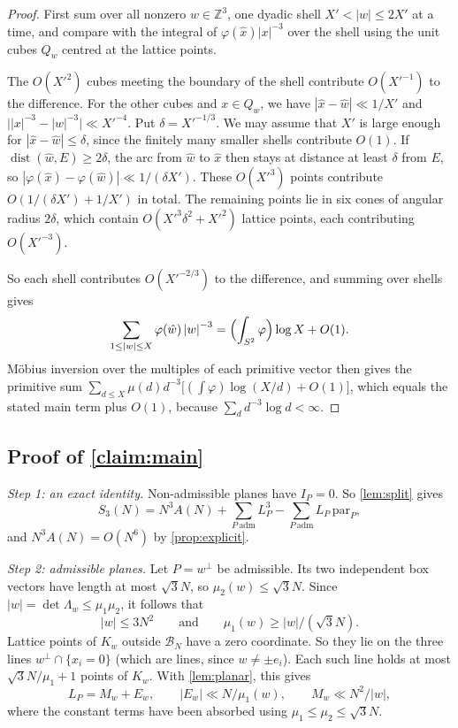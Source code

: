 \documentclass[11pt]{article}
\theoremstyle{definition}
\newcommand{\Z}{\mathbb{Z}}
\newcommand{\BN}{\mathcal{B}_N}
\newcommand{\abs}[1]{\left\lvert #1 \right\rvert}
\begin{document}
\begin{proof}
First sum over all nonzero $w\in\Z^3$, one dyadic shell $X'<\abs w\le2X'$ at a time, and compare with the integral of $\varphi(\hat x)\abs x^{-3}$ over the shell using the unit cubes $Q_w$ centred at the lattice points.

The $O(X'^2)$ cubes meeting the boundary of the shell contribute $O(X'^{-1})$ to the difference. For the other cubes and $x\in Q_w$, we have $\abs{\hat x-\hat w}\ll1/X'$ and $\bigl|\abs x^{-3}-\abs w^{-3}\bigr|\ll X'^{-4}$. Put $\delta=X'^{-1/3}$. We may assume that $X'$ is large enough for $\abs{\hat x-\hat w}\le\delta$, since the finitely many smaller shells contribute $O(1)$. If $\operatorname{dist}(\hat w,E)\ge2\delta$, the arc from $\hat w$ to $\hat x$ then stays at distance at least $\delta$ from $E$, so $\abs{\varphi(\hat x)-\varphi(\hat w)}\ll1/(\delta X')$. These $O(X'^3)$ points contribute $O(1/(\delta X')+1/X')$ in total. The remaining points lie in six cones of angular radius $2\delta$, which contain $O(X'^3\delta^2+X'^2)$ lattice points, each contributing $O(X'^{-3})$.

So each shell contributes $O(X'^{-2/3})$ to the difference, and summing over shells gives
\[
\sum_{1\le\abs w\le X}\varphi(\hat w)\abs w^{-3}=\Bigl(\int_{S^2}\varphi\Bigr)\log X+O(1).
\]
Möbius inversion over the multiples of each primitive vector then gives the primitive sum $\sum_{d\le X}\mu(d)d^{-3}\bigl[(\int\varphi)\log(X/d)+O(1)\bigr]$, which equals the stated main term plus $O(1)$, because $\sum_dd^{-3}\log d<\infty$.
\end{proof}

\subsection{Proof of \texorpdfstring{\cref{claim:main}}{the main theorem}}

\emph{Step 1: an exact identity.} Non-admissible planes have $I_P=0$. So \cref{lem:split} gives
\begin{equation}\label{eq:identity}
S_3(N)=N^3A(N)+\sum_{P\ \text{adm}}L_P^3-\sum_{P\ \text{adm}}L_P\,\mathrm{par}_P,
\end{equation}
and $N^3A(N)=O(N^6)$ by \cref{prop:explicit}.

\emph{Step 2: admissible planes.} Let $P=w^\perp$ be admissible. Its two independent box vectors have length at most $\sqrt3N$, so $\mu_2(w)\le\sqrt3N$. Since $\abs w=\det\Lambda_w\le\mu_1\mu_2$, it follows that
\[
\abs w\le3N^2\qquad\text{and}\qquad\mu_1(w)\ge\abs w/(\sqrt3N).
\]
Lattice points of $K_w$ outside $\BN$ have a zero coordinate. So they lie on the three lines $w^\perp\cap\{x_i=0\}$ (which are lines, since $w\ne\pm e_i$). Each such line holds at most $\sqrt3N/\mu_1+1$ points of $K_w$. With \cref{lem:planar}, this gives
\[
L_P=M_w+E_w,\qquad \abs{E_w}\ll N/\mu_1(w),\qquad M_w\ll N^2/\abs w,
\]
where the constant terms have been absorbed using $\mu_1\le\mu_2\le\sqrt3N$.
\end{document}
